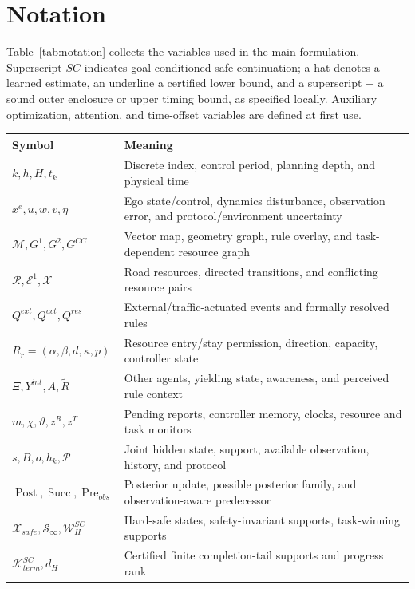 \documentclass[letterpaper]{article} %
\begin{document}
\section{Notation}
\label{app:notation}
Table~\ref{tab:notation} collects the variables used in the main formulation. Superscript $SC$ indicates goal-conditioned safe continuation; a hat denotes a learned estimate, an underline a certified lower bound, and a superscript $+$ a sound outer enclosure or upper timing bound, as specified locally. Auxiliary optimization, attention, and time-offset variables are defined at first use.
\begin{table}[t]
\centering\small
\begin{tabular}{@{}p{}p{}@{}}
\toprule
Symbol & Meaning\\
\midrule
$k,h,H,t_k$ & Discrete index, control period, planning depth, and physical time\\
$x^e,u,w,v,\eta$ & Ego state/control, dynamics disturbance, observation error, and protocol/environment uncertainty\\
$\mathcal M,G^1,G^2,G^{CC}$ & Vector map, geometry graph, rule overlay, and task-dependent resource graph\\
$\mathcal R,\mathcal E^1,\mathcal X$ & Road resources, directed transitions, and conflicting resource pairs\\
$Q^{ext},Q^{act},Q^{res}$ & External/traffic-actuated events and formally resolved rules\\
$R_r=(\alpha,\beta,d,\kappa,p)$ & Resource entry/stay permission, direction, capacity, controller state\\
$\Xi,Y^{int},A,\widetilde R$ & Other agents, yielding state, awareness, and perceived rule context\\
$m,\chi,\vartheta,z^R,z^T$ & Pending reports, controller memory, clocks, resource and task monitors\\
$s,B,o,h_k,\mathcal P$ & Joint hidden state, support, available observation, history, and protocol\\
$\operatorname{Post},\operatorname{Succ},\operatorname{Pre}_{obs}$ & Posterior update, possible posterior family, and observation-aware predecessor\\
$\mathcal X_{safe},\mathcal S_\infty,\mathcal W_H^{SC}$ & Hard-safe states, safety-invariant supports, task-winning supports\\
$\mathcal K_{term}^{SC},d_H$ & Certified finite completion-tail supports and progress rank\\

\end{tabular}
\end{table}
\end{document}
